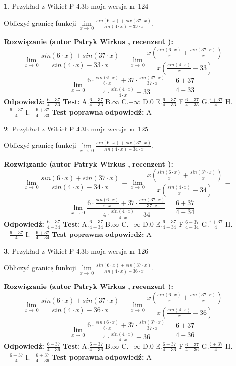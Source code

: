 \documentclass[12pt, a4paper]{article}
\theoremstyle{definition} %
\newtheorem{zad}{}
\newcommand{\zadStart}[1]{\begin{zad}#1\newline}
\newcommand{\zadStop}{\end{zad}}
\newcommand{\rozwStart}[2]{\noindent \textbf{Rozwiązanie (autor #1 , recenzent #2): }\newline}
\newcommand{\rozwStop}{\newline}
\newcommand{\odpStart}{\noindent \textbf{Odpowiedź:}\newline}
\newcommand{\odpStop}{\newline}
\newcommand{\testStart}{\noindent \textbf{Test:}\newline}
\newcommand{\testStop}{\newline}
\newcommand{\kluczStart}{\noindent \textbf{Test poprawna odpowiedź:}\newline}
\newcommand{\kluczStop}{\newline}
\begin{document}
\zadStart{Przykład z Wikieł P 4.3b moja wersja nr 124}


Obliczyć granicę funkcji $\lim\limits_{x\to\ 0}\frac{sin(6 \cdot x)+sin(37 \cdot x)}{sin(4 \cdot x)-33 \cdot x}$.
\zadStop
\rozwStart{Patryk Wirkus}{}
$$\lim\limits_{x\to\ 0}\frac{sin(6 \cdot x)+sin(37 \cdot x)}{sin(4 \cdot x)-33 \cdot x}=\lim\limits_{x\to\ 0}\frac{x(\frac{sin(6 \cdot x)}{x}+\frac{sin(37 \cdot x)}{x})}{x(\frac{sin(4 \cdot x)}{x}-33)}=$$
$$=\lim\limits_{x\to\ 0}\frac{6 \cdot \frac{sin(6 \cdot x)}{6 \cdot x}+37 \cdot \frac{sin(37 \cdot x)}{37 \cdot x}}{4 \cdot \frac{sin(4 \cdot x)}{4 \cdot x}-33}=\frac{6+37}{4-33}$$
\rozwStop
\odpStart
$\frac{6+37}{4-33}$
\odpStop
\testStart
A.$\frac{6+37}{4-33}$
B.$\infty$
C.$-\infty$
D.$0$
E.$\frac{6+37}{4+33}$
F.$\frac{6-37}{4-33}$
G.$\frac{6+37}{4}$
H.$-\frac{6+37}{4}$
I.$-\frac{6+37}{4-33}$
\testStop
\kluczStart
A
\kluczStop



\zadStart{Przykład z Wikieł P 4.3b moja wersja nr 125}


Obliczyć granicę funkcji $\lim\limits_{x\to\ 0}\frac{sin(6 \cdot x)+sin(37 \cdot x)}{sin(4 \cdot x)-34 \cdot x}$.
\zadStop
\rozwStart{Patryk Wirkus}{}
$$\lim\limits_{x\to\ 0}\frac{sin(6 \cdot x)+sin(37 \cdot x)}{sin(4 \cdot x)-34 \cdot x}=\lim\limits_{x\to\ 0}\frac{x(\frac{sin(6 \cdot x)}{x}+\frac{sin(37 \cdot x)}{x})}{x(\frac{sin(4 \cdot x)}{x}-34)}=$$
$$=\lim\limits_{x\to\ 0}\frac{6 \cdot \frac{sin(6 \cdot x)}{6 \cdot x}+37 \cdot \frac{sin(37 \cdot x)}{37 \cdot x}}{4 \cdot \frac{sin(4 \cdot x)}{4 \cdot x}-34}=\frac{6+37}{4-34}$$
\rozwStop
\odpStart
$\frac{6+37}{4-34}$
\odpStop
\testStart
A.$\frac{6+37}{4-34}$
B.$\infty$
C.$-\infty$
D.$0$
E.$\frac{6+37}{4+34}$
F.$\frac{6-37}{4-34}$
G.$\frac{6+37}{4}$
H.$-\frac{6+37}{4}$
I.$-\frac{6+37}{4-34}$
\testStop
\kluczStart
A
\kluczStop



\zadStart{Przykład z Wikieł P 4.3b moja wersja nr 126}


Obliczyć granicę funkcji $\lim\limits_{x\to\ 0}\frac{sin(6 \cdot x)+sin(37 \cdot x)}{sin(4 \cdot x)-36 \cdot x}$.
\zadStop
\rozwStart{Patryk Wirkus}{}
$$\lim\limits_{x\to\ 0}\frac{sin(6 \cdot x)+sin(37 \cdot x)}{sin(4 \cdot x)-36 \cdot x}=\lim\limits_{x\to\ 0}\frac{x(\frac{sin(6 \cdot x)}{x}+\frac{sin(37 \cdot x)}{x})}{x(\frac{sin(4 \cdot x)}{x}-36)}=$$
$$=\lim\limits_{x\to\ 0}\frac{6 \cdot \frac{sin(6 \cdot x)}{6 \cdot x}+37 \cdot \frac{sin(37 \cdot x)}{37 \cdot x}}{4 \cdot \frac{sin(4 \cdot x)}{4 \cdot x}-36}=\frac{6+37}{4-36}$$
\rozwStop
\odpStart
$\frac{6+37}{4-36}$
\odpStop
\testStart
A.$\frac{6+37}{4-36}$
B.$\infty$
C.$-\infty$
D.$0$
E.$\frac{6+37}{4+36}$
F.$\frac{6-37}{4-36}$
G.$\frac{6+37}{4}$
H.$-\frac{6+37}{4}$
I.$-\frac{6+37}{4-36}$
\testStop
\kluczStart
A
\kluczStop
\end{document}
